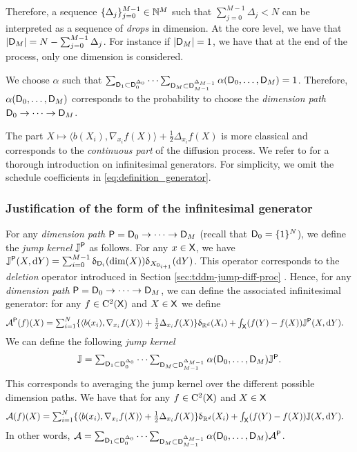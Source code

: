 Therefore, a sequence $\{\Delta_j\}_{j=0}^{M-1} \in \mathbb{N}^{M}$ such that
$\sum_{j=0}^{M-1} \Delta_j < N$ can be interpreted as a sequence of
\emph{drops} in dimension. At the core level, we have that
$|\mathsf{D}_M| = N - \sum_{j=0}^{M-1} \Delta_j$. For instance if
$|\mathsf{D}_M| = 1$, we have that at the end of the process, only one dimension
is considered.

We choose $\alpha$ such that
$\sum_{\mathsf{D}_1 \subset \mathsf{D}_0^{\Delta_0}} \dots \sum_{\mathsf{D}_M \subset
  \mathsf{D}_{M-1}^{\Delta_{M-1}}} \alpha(\mathsf{D}_0, \dots, \mathsf{D}_M) = 1$. Therefore,
$\alpha(\mathsf{D}_0, \dots, \mathsf{D}_M)$ corresponds to the probability to choose the
\emph{dimension path} $\mathsf{D}_0 \to \dots \to \mathsf{D}_M$.

The part
$X \mapsto \langle b(X_i), \nabla_{x_i}f(X) \rangle + \tfrac{1}{2} \Delta_{x_i}f(X)$ is
more classical and corresponds to the \emph{continuous part} of the diffusion
process. We refer to \cite{ethier2009markov} for a thorough introduction on
infinitesimal generators. For simplicity, we omit the schedule coefficients in
\eqref{eq:definition_generator}.

\subsubsection{Justification of the form of the infinitesimal generator}
\label{sec:tddm-just-form-infin}

For any \emph{dimension path} $\mathsf{P} = \mathsf{D}_0 \to \dots \to \mathsf{D}_M$ (recall that
$\mathsf{D}_0 = \{1\}^N$), we define the \emph{jump kernel} $\mathbb{J}^{\mathsf{P}}$ as
follows. For any $x \in \mathsf{X}$, we have
$\mathbb{J}^{\mathsf{P}}(X, \mathrm{d} Y) = \sum_{i=0}^{M-1} \updelta_{\mathsf{D}_i}(\mathrm{dim}(X))
\updelta_{X_{\mathsf{D}_{i+1}}}(\mathrm{d} Y)$. This operator corresponds to the \emph{deletion}
operator introduced in Section \ref{sec:tddm-jump-diff-proc} . Hence, for any \emph{dimension
  path} $\mathsf{P} = \mathsf{D}_0 \to \dots \to \mathsf{D}_M$, we can define the associated
infinitesimal generator: for any $f \in \mathrm{C}^2(\mathsf{X})$ and $X \in \mathsf{X}$ we define
\begin{align}
  {\mathcal{A}}^{\mathsf{P}}(f)(X) &\textstyle= \sum_{i=1}^N \{ \langle b(x_i), \nabla_{x_i}f(X) \rangle + \tfrac{1}{2} \Delta_{x_i}f(X)\} \updelta_{\mathbb{R}^d}(X_i) + \int_{\mathsf{X}}(f(Y) - f(X))\mathbb{J}^{\mathsf{P}}(X, \mathrm{d} Y) .
\end{align}
We can define the following \emph{jump kernel}
\begin{equation}
  \textstyle \mathbb{J} = \sum_{\mathsf{D}_1 \subset \mathsf{D}_0^{\Delta_0}} \dots  \sum_{\mathsf{D}_M \subset \mathsf{D}_{M-1}^{\Delta_{M-1}}} \alpha(\mathsf{D}_0, \dots, \mathsf{D}_M) \mathbb{J}^{\mathsf{P}} .
\end{equation}
This corresponds to averaging the jump kernel over the different possible
dimension paths. We have that for any $f \in \mathrm{C}^2(\mathsf{X})$ and $X \in \mathsf{X}$
\begin{align}
  \label{eq:inf_gen_tot}
  {\mathcal{A}}(f)(X) &\textstyle= \sum_{i=1}^N \{ \langle b(x_i), \nabla_{x_i}f(X) \rangle + \tfrac{1}{2} \Delta_{x_i}f(X)\} \updelta_{\mathbb{R}^d}(X_i) + \int_{\mathsf{X}}(f(Y) - f(X))\mathbb{J}(X, \mathrm{d} Y) .
\end{align}
In other words,
${\mathcal{A}} = \sum_{\mathsf{D}_1 \subset \mathsf{D}_0^{\Delta_0}} \dots \sum_{\mathsf{D}_M \subset
  \mathsf{D}_{M-1}^{\Delta_{M-1}}} \alpha(\mathsf{D}_0, \dots, \mathsf{D}_M) {\mathcal{A}}^{\mathsf{P}}$.

